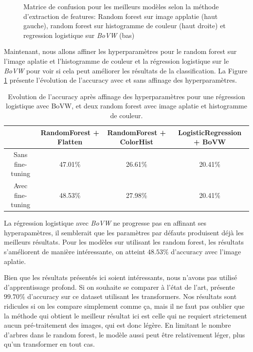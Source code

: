 \begin{figure}
\caption{Matrice de confusion pour les meilleurs modèles selon la méthode d'extraction de features: Random forest sur image applatie (haut gauche), random forest sur histogramme de couleur (haut droite) et regression logistique sur \textit{BoVW} (bas)}
\label{fig:confusion}
\end{figure}

Maintenant, nous allons affiner les hyperparamètres pour le random forest sur l'image aplatie et l'histogramme de couleur et la régression logistique sur le \textit{BoVW} pour voir si cela peut améliorer les résultats de la classification. La Figure \ref{tab:fine_tuning} présente l'évolution de l'accuracy avec et sans affinage des hyperparamètres.

\begin{table}[ht]
\centering
\begin{tabular}{|c|c|c|c|}
\toprule
& RandomForest + Flatten & RandomForest + ColorHist & LogisticRegression + BoVW \\
\midrule
Sans fine-tuning & 47.01\% & 26.61\% & 20.41\% \\
Avec fine-tuning & 48.53\% & 27.98\% & 20.41\% \\
\bottomrule
\end{tabular}
\caption{Evolution de l'accuracy après affinage des hyperparamètres pour une régression logistique avec BoVW, et deux random forest avec image aplatie et histogramme de couleur.}
\label{tab:fine_tuning}
\end{table}
La régression logistique avec \textit{BoVW} ne progresse pas en affinant ses hyperapamètres, il semblerait que les paramètres par défauts produisent déjà les meilleurs résultats.
Pour les modèles sur utilisant les random forest, les résultats s'améliorent de manière intéressante, on atteint $48.53\%$ d'accuracy avec l'image aplatie.

Bien que les résultats présentés ici soient intéressants, nous n'avons pas utilisé d'apprentissage profond. Si on souhaite se comparer à l'état de l'art, \cite{kabir2023reduction} présente $99.70\%$ d'accuracy sur ce dataset utilisant les transformers. Nos résultats sont ridicules si on les compare simplement comme ça, mais il ne faut pas oublier que la méthode qui obtient le meilleur résultat ici est celle qui ne requiert strictement aucun pré-traitement des images, qui est donc légère. En limitant le nombre d'arbres dans le random forest, le modèle aussi peut être relativement léger, plus qu'un transformer en tout cas.